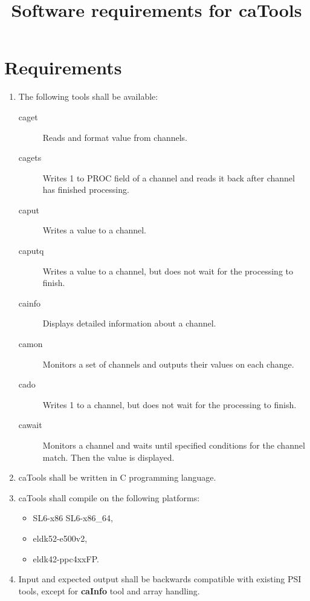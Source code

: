 \documentclass[12pt,a4paper]{article}
\title{Software requirements for caTools}
\date{}
\begin{document}
\maketitle



\section{Requirements}
\begin{enumerate}
	\item The following tools shall be available:
	\begin{description}
		\item [caget] Reads and format value from channels.
		\item [cagets] Writes 1 to PROC field of a channel and reads it back after channel has finished processing.
		\item [caput] Writes a value to a channel.
		\item [caputq] Writes a value to a channel, but does not wait for the processing to finish.
		\item [cainfo] Displays detailed information about a channel.
		\item [camon] Monitors a set of channels and outputs their values on each change.
		\item [cado] Writes 1 to a channel, but does not wait for the processing to finish.
		\item [cawait] Monitors a channel and waits until specified conditions for the channel match. Then the value is displayed.
	\end{description}
	\item caTools shall be written in C programming language.
	\item caTools shall compile on the following platforms:
	\begin{itemize}
		\item SL6-x86 SL6-x86\_64,
		\item eldk52-e500v2,
		\item eldk42-ppc4xxFP.
	\end{itemize}
	\item Input and expected output shall be backwards compatible with existing PSI tools, except for \textbf{caInfo} tool and array handling.

\end{enumerate}
\end{document}
